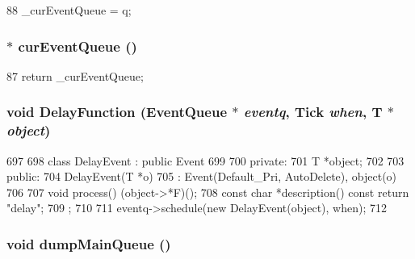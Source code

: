 \begin{DoxyCode}
88 { _curEventQueue = q; }
\end{DoxyCode}
\hypertarget{eventq_8hh_a64a8603a1af7020a19d30c54152fdcb2}{
\subsubsection[{curEventQueue}]{$\ast$ curEventQueue ()}}
\label{eventq_8hh_a64a8603a1af7020a19d30c54152fdcb2}



\begin{DoxyCode}
87 { return _curEventQueue; }
\end{DoxyCode}
\hypertarget{eventq_8hh_a9992bd1a54709fbb3d7e0e8ab62702c0}{
\subsubsection[{DelayFunction}]{\setlength{\rightskip}{0pt plus 5cm}void DelayFunction ({\bf EventQueue} $\ast$ {\em eventq}, \/  {\bf Tick} {\em when}, \/  T $\ast$ {\em object})}}
\label{eventq_8hh_a9992bd1a54709fbb3d7e0e8ab62702c0}



\begin{DoxyCode}
697 {
698     class DelayEvent : public Event
699     {
700       private:
701         T *object;
702 
703       public:
704         DelayEvent(T *o)
705             : Event(Default_Pri, AutoDelete), object(o)
706         { }
707         void process() { (object->*F)(); }
708         const char *description() const { return "delay"; }
709     };
710 
711     eventq->schedule(new DelayEvent(object), when);
712 }
\end{DoxyCode}
\hypertarget{eventq_8hh_afa9cf950f7afca6dc9b1fc2328df2d43}{
\subsubsection[{dumpMainQueue}]{\setlength{\rightskip}{0pt plus 5cm}void dumpMainQueue ()}}
\label{eventq_8hh_afa9cf950f7afca6dc9b1fc2328df2d43}



